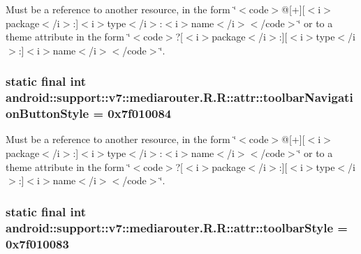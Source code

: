 Must be a reference to another resource, in the form \char`\"{}$<$code$>$@\mbox{[}+\mbox{]}\mbox{[}$<$i$>$package$<$/i$>$:\mbox{]}$<$i$>$type$<$/i$>$:$<$i$>$name$<$/i$>$$<$/code$>$\char`\"{} or to a theme attribute in the form \char`\"{}$<$code$>$?\mbox{[}$<$i$>$package$<$/i$>$:\mbox{]}\mbox{[}$<$i$>$type$<$/i$>$:\mbox{]}$<$i$>$name$<$/i$>$$<$/code$>$\char`\"{}. \hypertarget{classandroid_1_1support_1_1v7_1_1mediarouter_1_1_r_1_1attr_d5b86358eb76c96e6af0d921ec62c9b1}{
\subsubsection[{toolbarNavigationButtonStyle}]{\setlength{\rightskip}{0pt plus 5cm}static final int android::support::v7::mediarouter.R.R::attr::toolbarNavigationButtonStyle = 0x7f010084}}
\label{classandroid_1_1support_1_1v7_1_1mediarouter_1_1_r_1_1attr_d5b86358eb76c96e6af0d921ec62c9b1}


Must be a reference to another resource, in the form \char`\"{}$<$code$>$@\mbox{[}+\mbox{]}\mbox{[}$<$i$>$package$<$/i$>$:\mbox{]}$<$i$>$type$<$/i$>$:$<$i$>$name$<$/i$>$$<$/code$>$\char`\"{} or to a theme attribute in the form \char`\"{}$<$code$>$?\mbox{[}$<$i$>$package$<$/i$>$:\mbox{]}\mbox{[}$<$i$>$type$<$/i$>$:\mbox{]}$<$i$>$name$<$/i$>$$<$/code$>$\char`\"{}. \hypertarget{classandroid_1_1support_1_1v7_1_1mediarouter_1_1_r_1_1attr_af484d1ecdcb0597073563e783c15f97}{
\subsubsection[{toolbarStyle}]{\setlength{\rightskip}{0pt plus 5cm}static final int android::support::v7::mediarouter.R.R::attr::toolbarStyle = 0x7f010083}}
\label{classandroid_1_1support_1_1v7_1_1mediarouter_1_1_r_1_1attr_af484d1ecdcb0597073563e783c15f97}


